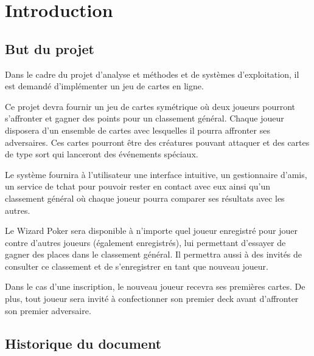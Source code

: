 \documentclass[11pt,a4paper]{article}
\begin{document}

\pagestyle{empty}
\tableofcontents
\newpage
\pagestyle{fancy}

\setcounter{page}{1}

\section{Introduction}
\label{sec:intro}

\subsection{But du projet}
\label{sec:but}

Dans le cadre du projet d'analyse et méthodes et de systèmes
d'exploitation, il est demandé d'implémenter un jeu de cartes en ligne.

\medbreak

Ce projet devra fournir un jeu de cartes symétrique où deux joueurs
pourront s'affronter et gagner des points pour un classement
général. Chaque joueur disposera d'un ensemble de cartes avec lesquelles
il pourra affronter ses adversaires. Ces cartes pourront être des
créatures pouvant attaquer et des cartes de type
sort qui lanceront des événements spéciaux.

\medbreak

Le système fournira à l'utilisateur une interface intuitive, un gestionnaire
d'amis, un service de tchat pour pouvoir rester en contact avec eux ainsi
qu'un classement général où chaque joueur pourra comparer ses résultats avec
les autres.

\medbreak

Le Wizard Poker sera disponible à n'importe quel joueur enregistré
pour jouer contre d'autres joueurs (également enregistrés), lui 
permettant d'essayer de gagner des places dans le classement 
général. Il permettra aussi à des invités de consulter ce classement 
et de s'enregistrer en tant que nouveau joueur. 

\medbreak

Dans le cas d'une inscription, le nouveau joueur recevra ses premières cartes. De plus, tout joueur sera invité à confectionner son premier deck avant d'affronter son premier adversaire.

\subsection{Historique du document}
\label{sec:hist}
\end{document}
